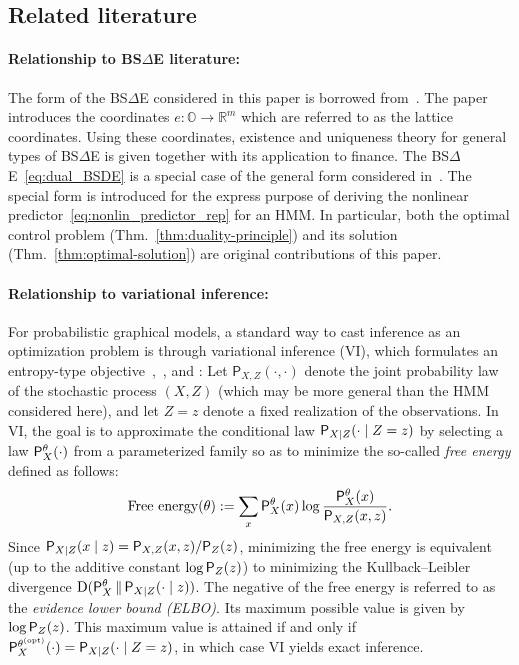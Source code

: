 \documentclass[twoside,11pt]{article}
\def\Re{\mathbb{R}}
\newcommand{\field}[1]{\mathbb{#1}}
\def\Re{\field{R}}
\def\Re{\mathbb{R}}
\def\Thm#1{Thm.~\ref{#1}}
\renewcommand{\Re}{\mathbb{R}}
\def\bO{\mathbb{O}}
\def\sP{{\sf P}}
\def\opt{{\text{\rm (opt)}}}
\begin{document}
     \subsection{Related literature}\label{sec:related_literature}

     \paragraph{Relationship to BS$\Delta$E literature:} The form of
     the BS$\Delta$E considered in this paper is borrowed
     from~\cite{fukasawa2025backward}.  The paper introduces the
     coordinates $e:\bO\to\Re^m$ which are referred to as the lattice
     coordinates.  Using these coordinates, 
     existence and uniqueness theory for general types of  BS$\Delta$E
     is given together with its application to
     finance.  The BS$\Delta$E~\eqref{eq:dual_BSDE} is a special case
     of the general form considered in~\cite{fukasawa2025backward}.
     The special form is introduced for the express purpose of
     deriving the nonlinear predictor~\eqref{eq:nonlin_predictor_rep}
     for an HMM.  In particular, both the
     optimal control problem (\Thm{thm:duality-principle}) and its
     solution (\Thm{thm:optimal-solution}) are 
     original contributions of this paper.  

\paragraph{Relationship to variational inference:}
For probabilistic graphical models, a standard way to cast
inference as an optimization problem is through variational inference
(VI), which formulates an entropy-type objective~\citep{jordan1999introduction},~\cite[Sec.~3]{wainwright2008graphical},
and
\cite[Ch.~11]{koller2009probabilistic}:  Let $\mathsf{P}_{X,Z}(\cdot,\cdot)$ denote the joint probability law of the
stochastic process $(X,Z)$ (which may be more general than the HMM
considered here), and let $Z=z$ denote a
fixed realization of the observations. In VI, the goal is to
approximate the conditional law $\sP_{X|Z}(\cdot \mid Z=z)$ by selecting a
law $\sP^\theta_X(\cdot)$ from a parameterized family so as to
minimize the so-called {\em free energy} defined as follows:
\begin{equation*}
\text{Free energy}(\theta)
:= \sum_{x} \sP^\theta_X(x)
\log \frac{\sP^\theta_X(x)}{\sP_{X,Z}(x, z)} .
\end{equation*}
Since $\sP_{X|Z}(x \mid z) = \sP_{X,Z}(x,z)/\sP_Z(z)$, minimizing the
free energy is equivalent (up to the additive constant $\log
\sP_Z(z)$) to minimizing the Kullback--Leibler divergence
$\mathrm{D}(\sP^\theta_X \,\|\, \sP_{X|Z}(\cdot \mid z))$. 
The negative of the free energy is referred to as the {\em evidence
  lower bound (ELBO)}.  Its maximum possible value is given by $\log
\sP_{Z}(z)$.  This maximum value is attained if and only if
$\sP^{\theta^\opt}_X(\cdot)=\sP_{X|Z}(\cdot \mid Z=z)$, in which case VI yields exact inference.
\end{document}
